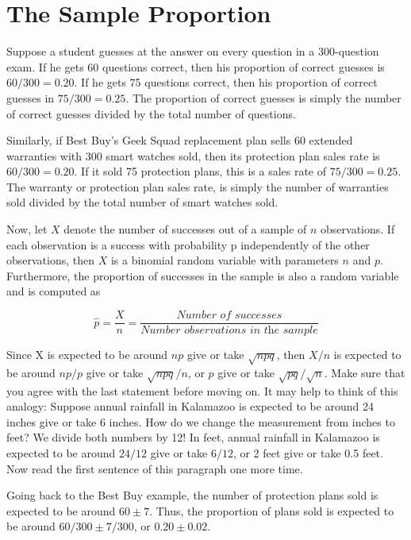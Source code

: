 \documentclass[11pt, chapterprefix=true]{scrbook}\usepackage[]{graphicx}\usepackage[]{color}
\begin{document}
\section{The Sample Proportion}

Suppose a student guesses at the answer on every question in a 300-question exam.  If he gets 60 questions correct, then his proportion of correct guesses is $60/300 = 0.20$.  If he gets 75 questions correct, then his proportion of correct guesses in $75/300 = 0.25$.  The proportion of correct guesses is simply the number of correct guesses divided by the total number of questions.

Similarly, if Best Buy's Geek Squad replacement plan sells 60 extended warranties with 300 smart watches sold, then its protection plan sales rate is $60/300 = 0.20$. If it sold 75 protection plans, this is a sales rate of $75/300 = 0.25$.  The warranty or protection plan sales rate, is simply the number of warranties sold divided by the total number of smart watches sold.

Now, let $X$ denote the number of successes out of a sample of $n$ observations. If each observation is a success with probability p independently of the other observations, then $X$ is a binomial random variable with parameters $n$ and $p$.  Furthermore, the proportion of successes in the sample is also a random variable and is computed as

\begin{equation*}
  \hat{p} = \frac{X}{n} = \frac{\textit{Number of successes}}{\textit{Number observations in the sample}}
\end{equation*}

Since X is expected to be around $np$ give or take $\sqrt{npq}$, then $X/n$ is expected to be around $np/p$ give or take $\sqrt{npq}/n$, or $p$ give or take $\sqrt{pq}/\sqrt{n}$.  Make sure that you agree with the last statement before moving on.  It may help to think of this analogy: Suppose annual rainfall in Kalamazoo is expected to be around 24 inches give or take 6 inches.  How do we change the measurement from inches to feet?  We divide both numbers by 12! In feet, annual rainfall in Kalamazoo is expected to be around $24/12$ give or take $6/12$, or 2 feet give or take 0.5 feet.  Now read the first sentence of this paragraph one more time.

Going back to the Best Buy example, the number of protection plans sold is expected to be around $60 \pm 7$.   Thus, the proportion of plans sold is expected to be around $60/300 \pm 7/300$, or $0.20 \pm 0.02$.
\end{document}
